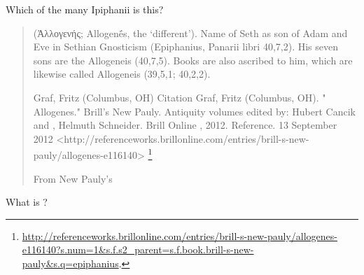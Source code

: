 \documentclass[12pt,letterpaper,twoside,final]{memoir}
\begin{document}
Which of the many Ipiphanii is this?

\blockquote[From New Pauly's]{(Ἀλλογενής; Allogenḗs, the ‘different’). Name of  Seth as son of Adam and Eve in Sethian  Gnosticism (Epiphanius, Panarii libri 40,7,2). His seven sons are the Allogeneis (40,7,5). Books are also ascribed to him, which are likewise called Allogeneis (39,5,1; 40,2,2).

Graf, Fritz (Columbus, OH)
Citation
Graf, Fritz (Columbus, OH). " Allogenes." Brill’s New Pauly. Antiquity volumes edited by: Hubert Cancik and , Helmuth Schneider. Brill Online , 2012. Reference. 13 September 2012 <http://referenceworks.brillonline.com/entries/brill-s-new-pauly/allogenes-e116140> \footnote{\url{http://referenceworks.brillonline.com/entries/brill-s-new-pauly/allogenes-e116140?s.num=1&s.f.s2_parent=s.f.book.brill-s-new-pauly&s.q=epiphanius}.}}

What is ?
\end{document}
